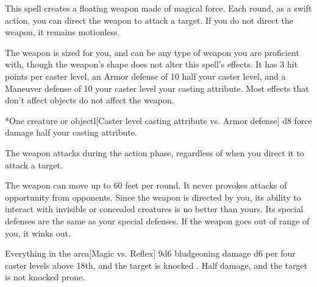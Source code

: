 \begin{spellheader}
    \spellrng{\rngmed}
    \spelldur{\durshort \dismissable}
\end{spellheader}
\begin{spelleffects}
    \spellline
    \spelleffect This spell creates a floating weapon made of magical force. Each round, as a swift action, you can direct the weapon to attack a target. If you do not direct the weapon, it remains motionless.

    The weapon is sized for you, and can be any type of weapon you are proficient with, though the weapon's shape does not alter this spell's effects. It has 3 hit points per caster level, an Armor defense of 10 \add half your caster level, and a Maneuver defense of 10 \add your caster level \add your casting attribute. Most effects that don't affect objects do not affect the weapon.

    \begin{spelltarget}*{One creature or object}l[Caster level \add casting attribute vs. Armor defense]
        \spellsuccess d8 force damage \add half your casting attribute.
    \end{spelltarget}
\end{spelleffects}
\begin{spellfooter}
    \spellnotes The weapon attacks during the action phase, regardless of when you direct it to attack a target.

    The weapon can move up to 60 feet per round. It never provokes attacks of opportunity from opponents. Since the weapon is directed by you, its ability to interact with invisible or concealed creatures is no better than yours. Its special defenses are the same as your special defenses. If the weapon goes out of range of you, it winks out.
\end{spellfooter}

\begin{spellheader}
    \spelldur{\durshort \dismissable}
\end{spellheader}
\begin{spelleffects}
    \begin{spelltarget}{Everything in the area}[Magic vs. Reflex]
        \spellsuccess 9d6 bludgeoning damage \add d6 per four caster levels above 18th, and the target is knocked \prone.
        \spellfailure Half damage, and the target is not knocked prone.
    \end{spelltarget}
\end{spelleffects}

